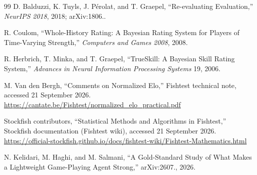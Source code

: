 \begin{thebibliography}{99}
D. Balduzzi, K. Tuyls, J. P\'erolat, and T. Graepel, ``Re-evaluating
Evaluation,'' \emph{NeurIPS 2018}, 2018; arXiv:1806..

R. Coulom, ``Whole-History Rating: A Bayesian Rating System for Players of
Time-Varying Strength,'' \emph{Computers and Games 2008}, 2008.

R. Herbrich, T. Minka, and T. Graepel, ``TrueSkill\texttrademark: A Bayesian
Skill Rating System,'' \emph{Advances in Neural Information Processing Systems}
19, 2006.

M. Van den Bergh, ``Comments on Normalized Elo,'' Fishtest technical note, accessed
21 September 2026.\\
\url{https://cantate.be/Fishtest/normalized_elo_practical.pdf}

Stockfish contributors, ``Statistical Methods and Algorithms in Fishtest,'' Stockfish
documentation (Fishtest wiki), accessed 21 September 2026.\\
\url{https://official-stockfish.github.io/docs/fishtest-wiki/Fishtest-Mathematics.html}

N. Kelidari, M. Haghi, and M. Salmani, ``A Gold-Standard Study of What Makes a
Lightweight Game-Playing Agent Strong,'' arXiv:2607., 2026.
\end{thebibliography}
